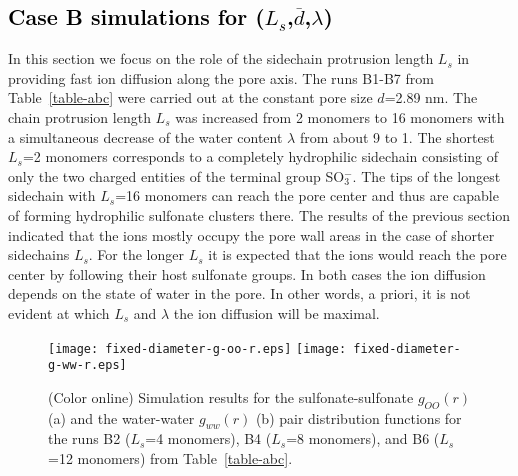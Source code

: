 \documentclass[3p,english,preprint]{elsarticle}
\newcommand{\mod}[1]{\textcolor{black}{#1}}
\newcommand{\mage}[1]{\textcolor{black}{#1}}
\begin{document}
{\mod{ 
\subsection{Case B simulations for ($L_s$,$\overline{d}$,$\lambda$)}
}}
 In this section  we focus on the role of the sidechain protrusion length $L_s$ in 
providing fast ion diffusion along the pore axis.  
The runs B1-B7 from Table~\ref{table-abc} were carried out at the constant 
pore size $d$=2.89 nm. The chain protrusion length $L_s$ was increased  from
  2 monomers to 16 monomers
with a  simultaneous decrease of  the  water content $\lambda$ from about 9 to 1.
The shortest $L_s$=2 monomers 
corresponds to a completely hydrophilic sidechain consisting of  only the 
two charged entities of the terminal group SO$_3^-$.
The tips of the longest sidechain with $L_s$=16 monomers  %
can reach the pore center and thus are capable of forming hydrophilic sulfonate clusters  there.  
The results of the previous section indicated that 
 the ions  mostly occupy the  pore wall areas in the case of shorter sidechains $L_s$. 
For the longer $L_s$  it is expected that the  
 ions would reach the pore center by following their host sulfonate groups. 
In both cases the ion diffusion depends on the state of water in the pore.
In other words, a  priori,  it is not evident at which $L_s$ and $\lambda$ the ion 
diffusion will be maximal.

\begin{figure}[!ht]   %
\begin{center}
\texttt{[image: fixed-diameter-g-oo-r.eps]} 
\texttt{[image: fixed-diameter-g-ww-r.eps]}
\end{center}
\vspace{-0.7cm}
\caption{(Color online) Simulation results for the    
sulfonate-sulfonate $g_{OO}(r)$ (a) and 
the water-water $g_{ww}(r)$ (b)
  pair distribution %
functions for the runs B2 ($L_s$=4 monomers), B4 ($L_s$=8 monomers), and B6
 ($L_s$=12 monomers)  from Table~\ref{table-abc}.
\label{fig-9-new}}
\end{figure}
\end{document}
